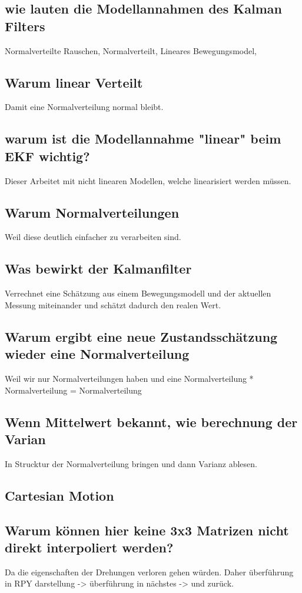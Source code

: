 \subsection{wie lauten die Modellannahmen des Kalman Filters}
Normalverteilte Rauschen, Normalverteilt, Lineares Bewegungsmodel,
\subsection{Warum linear Verteilt}
Damit eine Normalverteilung normal bleibt. 

\subsection{warum ist die Modellannahme "linear" beim EKF wichtig?}

Dieser Arbeitet mit nicht linearen Modellen, welche linearisiert werden müssen.

\subsection{Warum Normalverteilungen}
Weil diese deutlich einfacher zu verarbeiten sind.  

\subsection{Was bewirkt der Kalmanfilter}
Verrechnet eine Schätzung aus einem Bewegungsmodell und der aktuellen Messung miteinander und schätzt dadurch den realen Wert.

\subsection{Warum ergibt eine neue Zustandsschätzung wieder eine Normalverteilung}

Weil wir nur Normalverteilungen haben und eine Normalverteilung * Normalverteilung = Normalverteilung
\subsection{Wenn Mittelwert bekannt, wie berechnung der Varian}
In Strucktur der Normalverteilung bringen und dann Varianz ablesen.
\subsection{Cartesian Motion}


\subsection{Warum können hier keine 3x3 Matrizen nicht direkt interpoliert werden?}
Da die eigenschaften der Drehungen verloren gehen würden. Daher überführung in RPY darstellung -> überführung in nächstes -> und zurück.


